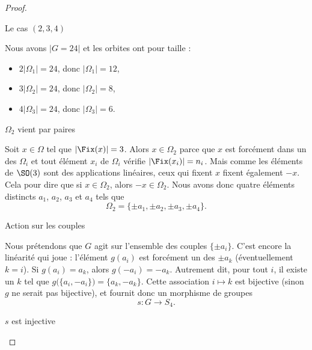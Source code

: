 \begin{proof}
\begin{subproof}
            \item[Le cas \( (2,3,4)\)]

                Nous avons \( | G=24 |\) et les orbites ont pour taille :
                \begin{itemize}
                    \item \( 2| \Omega_1 |=24\), donc \( | \Omega_1 |=12\),
                    \item \( 3| \Omega_2 |=24\), donc \( | \Omega_2 |=8\),
                    \item \( 4| \Omega_3 |=24\), donc  \( | \Omega_3 |=6\).
                \end{itemize}

                \begin{subproof}
                    \item[\( \Omega_2\) vient par paires]

                        Soit \( x\in \Omega\) tel que \( | \Fix(x) |=3\). Alors \( x\in\Omega_2\) parce que \( x\) est forcément dans un des \( \Omega_i\) et tout élément \( x_i\) de \( \Omega_i\) vérifie \( | \Fix(x_i) |=n_i\). Mais comme les éléments de \( \SO(3)\) sont des applications linéaires, ceux qui fixent \( x\) fixent également \( -x\). Cela pour dire que si \( x\in\Omega_2\), alors \( -x\in\Omega_2\). Nous avons donc quatre éléments distincts \( a_1\), \( a_2\), \( a_3\) et \( a_4\) tels que
                    \begin{equation}
                        \Omega_2=\{ \pm a_1,\pm a_2,\pm a_3,\pm a_4 \}.
                    \end{equation}

                \item[Action sur les couples]

                    Nous prétendons que \( G\) agit sur l'ensemble des couples \( \{ \pm a_i \}\). C'est encore la linéarité qui joue : l'élément \( g(a_i)\) est forcément un des \( \pm a_k\) (éventuellement \( k=i\)). Si \( g(a_i)=a_k\), alors \( g(-a_i)=-a_k\). Autrement dit, pour tout \( i\), il existe un \( k\) tel que \( g\big( \{ a_i,-a_i \} \big)=\{ a_k,-a_k \}\). Cette association \( i\mapsto k\) est bijective (sinon \( g\) ne serait pas bijective), et fournit donc un morphisme de groupes
                    \begin{equation}
                        s\colon G\to S_4.
                    \end{equation}

                \item[\( s\) est injective]


\end{subproof}
\end{subproof}
\end{proof}
